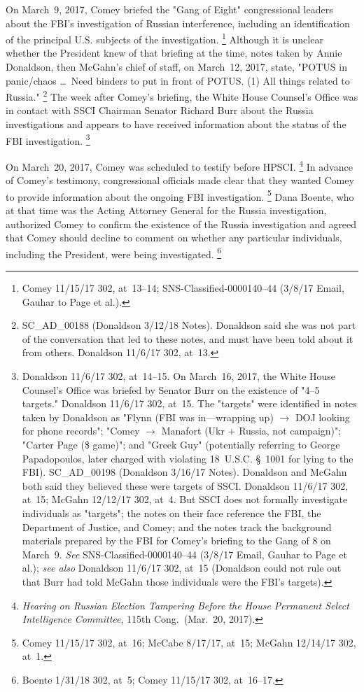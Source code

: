 On March~9, 2017, Comey briefed the "Gang of Eight" congressional leaders about the FBI's investigation of Russian interference, including an identification of the principal U.S. subjects of the investigation.%
\footnote{Comey 11/15/17 302, at~13--14;
SNS-Classified-0000140--44 (3/8/17 Email, Gauhar to Page et al.).}
Although it is unclear whether the President knew of that briefing at the time, notes taken by Annie Donaldson, then McGahn's chief of staff, on March~12, 2017, state, "POTUS in panic/chaos \dots\ Need binders to put in front of POTUS. (1) All things related to Russia."%
\footnote{SC\_AD\_00188 (Donaldson 3/12/18 Notes).
Donaldson said she was not part of the conversation that led to these notes, and must have been told about it from others.
Donaldson 11/6/17 302, at~13.}
The week after Comey's briefing, the White House Counsel's Office was in contact with SSCI Chairman Senator Richard Burr about the Russia investigations and appears to have received information about the status of the FBI investigation.%
\footnote{Donaldson 11/6/17 302, at~14--15.
On March~16, 2017, the White House Counsel's Office was briefed by Senator Burr on the existence of "4--5 targets."
Donaldson 11/6/17 302, at~15.
The "targets" were identified in notes taken by Donaldson as "Flynn (FBI was in---wrapping up) $\longrightarrow$ DOJ looking for phone records";
"Comey $\longrightarrow$ Manafort (Ukr + Russia, not campaign)";
"Carter Page (\$ game)";
and "Greek Guy" (potentially referring to George Papadopoulos, later charged with violating 18~U.S.C. \S~1001 for lying to the FBI).
SC\_AD\_00198 (Donaldson 3/16/17 Notes).
Donaldson and McGahn both said they believed these were targets of SSCI\null.
Donaldson 11/6/17 302, at~15;
McGahn 12/12/17 302, at~4.
But SSCI does not formally investigate individuals as "targets";
the notes on their face reference the FBI, the Department of Justice, and Comey;
and the notes track the background materials prepared by the FBI for Comey's briefing to the Gang of 8 on March~9.
\textit{See} SNS-Classified-0000140--44 (3/8/17 Email, Gauhar to Page et al.);
\textit{see also} Donaldson 11/6/17 302, at~15 (Donaldson could not rule out that Burr had told McGahn those individuals were the FBI's targets).}

On March~20, 2017, Comey was scheduled to testify before HPSCI\null.%
\footnote{\textit{Hearing on Russian Election Tampering Before the House Permanent Select Intelligence Committee}, 115th Cong.\ (Mar.~20, 2017).}
In advance of Comey's testimony, congressional officials made clear that they wanted Comey to provide information about the ongoing FBI investigation.%
\footnote{Comey 11/15/17 302, at~16;
McCabe 8/17/17, at~15;
McGahn 12/14/17 302, at~1.}
Dana Boente, who at that time was the Acting Attorney General for the Russia investigation, authorized Comey to confirm the existence of the Russia investigation and agreed that Comey should decline to comment on whether any particular individuals, including the President, were being investigated.%
\footnote{Boente 1/31/18 302, at~5;
Comey 11/15/17 302, at~16--17.}

